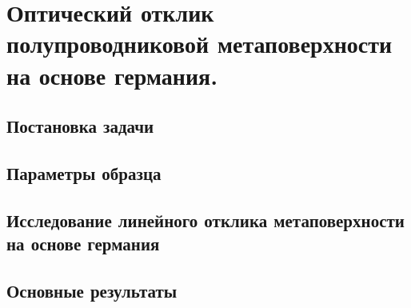 \section{Оптический отклик полупроводниковой метаповерхности на основе германия.}

\subsection{Постановка задачи}
\subsection{Параметры образца}
\subsection{Исследование линейного отклика метаповерхности на основе германия}
\subsection{Основные результаты}

